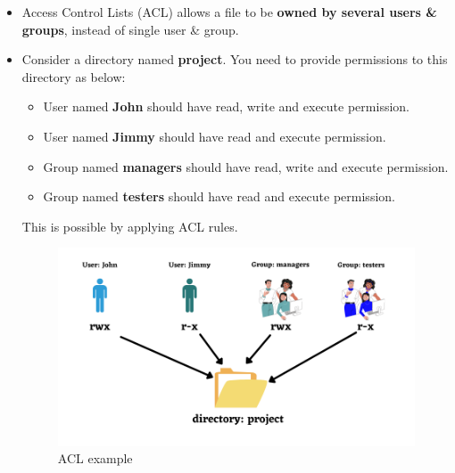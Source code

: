 \setlength{\columnsep}{3pt}
\begin{flushleft}
	\bigskip
	\begin{itemize}
		\item Access Control Lists (ACL) allows a file to be \textbf{owned by several users 
			\& groups}, instead of single user \& group.
		\item Consider a directory named \textbf{project}. You need to provide permissions to this directory as below:
		\begin{itemize}
			\item User named \textbf{John} should have read, write and execute permission.
			\item User named \textbf{Jimmy} should have read and execute permission.
			\item Group named \textbf{managers} should have read, write and execute permission.
			\item Group named \textbf{testers} should have read and execute permission.
		\end{itemize}
		\bigskip
		This is possible by applying ACL rules.
		\begin{figure}[h!]
			\centering
			\includegraphics[scale=0.6]{content/chapter6/images/acl.png}
			\caption{ACL example}
			\label{fig:acl_example}
		\end{figure}

		
		
		
	\end{itemize}

	
\end{flushleft}

\newpage

